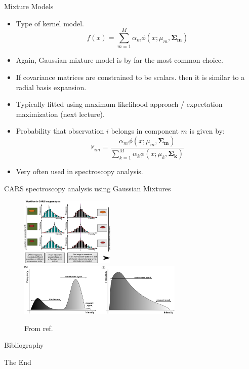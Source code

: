 \documentclass[aspectratio=169]{beamer}
\let \vec \mathbf
\begin{document}
\begin{frame}{Mixture Models}
    \begin{itemize}
        \item Type of kernel model.
        \begin{equation*}
            f(x) = \sum_{m=1}^M \alpha_m \phi(x; \mu_m, \vec{\Sigma_m})
        \end{equation*}
        \item Again, Gaussian mixture model is by far the most common choice.
        \item If covariance matrices are constrained to be scalars. then it is similar to a radial basis expansion.
        \item Typically fitted using maximum likelihood approach / expectation maximization (next lecture).
        \item Probability that observation $i$ belongs in component $m$ is given by:
        \begin{equation*}
            \hat{r}_{im} = \frac{\alpha_m \phi(x; \mu_m, \vec{\Sigma_m})}{\sum_{k=1}^M \alpha_k \phi(x; \mu_k, \vec{\Sigma_k})}
        \end{equation*}
        \item Very often used in spectroscopy analysis.
    \end{itemize}
\end{frame}


\begin{frame}{CARS spectroscopy analysis using Gaussian Mixtures}
\begin{figure}
    \centering
    \includegraphics[width=0.4\textwidth]{figures/cars1.jpeg}
    \includegraphics[width=0.7\textwidth]{figures/cars2.jpeg}
    \caption{From ref. \cite{voglerSeparationCARSImage2010}}
\end{figure}
\end{frame}


\begin{frame}{Bibliography}
    
    
\end{frame}




\begin{frame}
    \Huge{\centerline{The End}}
\end{frame}
\end{document}
